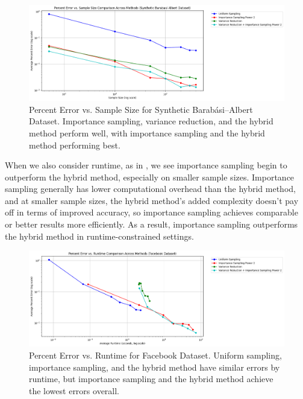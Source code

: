 \documentclass[11pt, margin=1in]{article}
\begin{document}
\begin{figure}[H]
\centering
\includegraphics[width=0.9\linewidth]{plots/comparisons/ba/limited_method_percent_error_vs_sample_size_comparison.png}
\caption{Percent Error vs. Sample Size for Synthetic Barabási–Albert Dataset. Importance sampling, variance reduction, and the hybrid method perform well, with importance sampling and the hybrid method performing best.}
\label{fig:ba_sample_size}
\end{figure}

When we also consider runtime, as in , we see importance sampling begin to outperform the hybrid method, especially on smaller sample sizes.
Importance sampling generally has lower computational overhead than the hybrid method, and at smaller sample sizes, the hybrid method's added complexity doesn't pay off in terms of improved accuracy, so importance sampling achieves comparable or better results more efficiently.
As a result, importance sampling outperforms the hybrid method in runtime-constrained settings.

\begin{figure}[H]
\centering
\includegraphics[width=0.9\linewidth]{plots/comparisons/fb/limited_method_percent_error_vs_runtime_comparison.png}
\caption{Percent Error vs. Runtime for Facebook Dataset. Uniform sampling, importance sampling, and the hybrid method have similar errors by runtime, but importance sampling and the hybrid method achieve the lowest errors overall.}
\label{fig:fb_runtime}
\end{figure}
\end{document}

